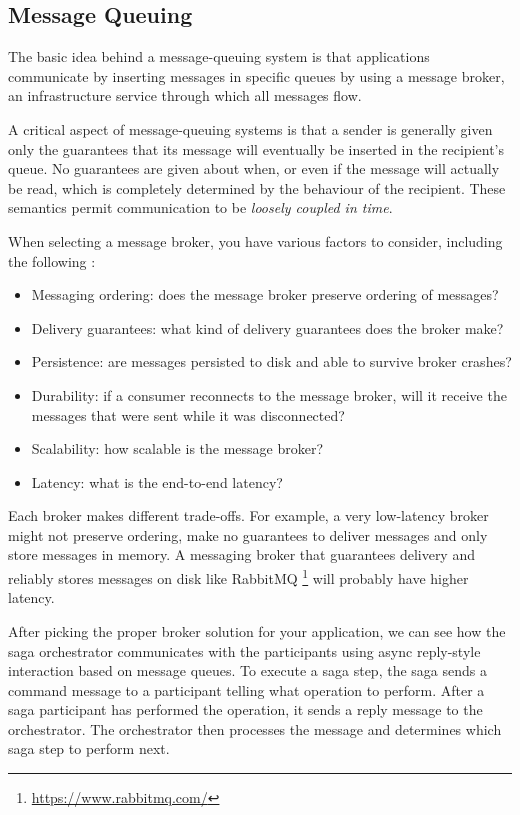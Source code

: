 \documentclass[conference]{IEEEtran}
\begin{document}
\subsection{Message Queuing}

The basic idea behind a message-queuing system is that applications communicate by inserting messages in specific queues by using a message broker, an infrastructure service through which all messages flow.

A critical aspect of message-queuing systems is that a sender is generally given only the guarantees that its message will eventually be inserted in the recipient's queue. No guarantees are given about when, or even if the message will actually be read, which is completely determined by the behaviour of the recipient. These semantics permit communication to be \textit{loosely coupled in time}.

When selecting a message broker, you have various factors to consider, including the following \cite{microservices-patterns-broker}:

\begin{itemize}
  \item Messaging ordering: does the message broker preserve ordering of messages?
  \item Delivery guarantees: what kind of delivery guarantees does the broker make?
  \item Persistence: are messages persisted to disk and able to survive broker crashes?
  \item Durability: if a consumer reconnects to the message broker, will it receive the messages that were sent while it was disconnected?
  \item Scalability: how scalable is the message broker?
  \item Latency: what is the end-to-end latency?
\end{itemize}

Each broker makes different trade-offs. For example, a very low-latency broker might not preserve ordering, make no guarantees to deliver messages and only store messages in memory. A messaging broker that guarantees delivery and reliably stores messages on disk like RabbitMQ \footnote{\url{https://www.rabbitmq.com/}} will probably have higher latency.

After picking the proper broker solution for your application, we can see how the saga orchestrator communicates with the participants using async reply-style interaction based on message queues. To execute a saga step, the saga sends a command message to a participant telling what operation to perform. After a saga participant has performed the operation, it sends a reply message to the orchestrator. The orchestrator then processes the message and determines which saga step to perform next.
\end{document}
